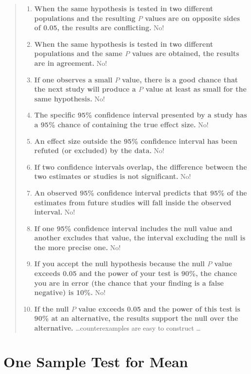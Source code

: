 \begin{quote}
\begin{enumerate}
  \item \textbf{When the same hypothesis is tested in two different populations and the resulting $P$ values are on opposite sides of 0.05, the results are conflicting.} No!
  \item \textbf{When the same hypothesis is tested in two different populations and the same $P$ values are obtained, the results are in agreement.} No!
  \item \textbf{If one observes a small $P$ value, there is a good chance that the next study will produce a $P$ value at least as small for the same hypothesis.} No!
  \item \textbf{The specific 95\% confidence interval presented by a study has a 95\% chance of containing the true effect size.} No!
  \item \textbf{An effect size outside the 95\% confidence interval has been refuted (or excluded) by the data.} No!
  \item \textbf{If two confidence intervals overlap, the difference between the two estimates or studies is not significant.} No!
  \item \textbf{An observed 95\% confidence interval predicts that 95\% of the estimates from future studies will fall inside the observed interval.} No!
  \item \textbf{If one 95\% confidence interval includes the null value and another excludes that value, the interval excluding the null is the more precise one.} No!
  \item \textbf{If you accept the null hypothesis because the null $P$ value exceeds 0.05 and the power of your test is 90\%, the chance you are in error (the chance that your finding is a false negative) is 10\%.} No!
  \item \textbf{If the null $P$ value exceeds 0.05 and the power of this test is 90\% at an alternative, the results support the null over the alternative.} \dots counterexamples are easy to construct \dots
 \end{enumerate}
\end{quote}

\section{One Sample Test for Mean} 

